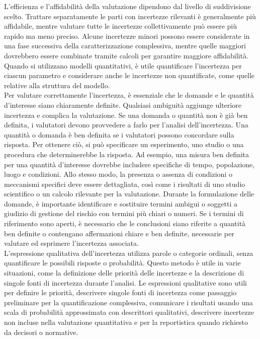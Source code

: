 L'efficienza e l'affidabilità della valutazione dipendono dal livello di suddivisione scelto. Trattare separatamente le parti con incertezze rilevanti è generalmente più affidabile, mentre valutare tutte le incertezze collettivamente può essere più rapido ma meno preciso. Alcune incertezze minori possono essere considerate in una fase successiva della caratterizzazione complessiva, mentre quelle maggiori dovrebbero essere combinate tramite calcoli per garantire maggiore affidabilità. Quando si utilizzano modelli quantitativi, è utile quantificare l'incertezza per ciascun parametro e considerare anche le incertezze non quantificate, come quelle relative alla struttura del modello.\\

Per valutare correttamente l'incertezza, è essenziale che le domande e le quantità d'interesse siano chiaramente definite. Qualsiasi ambiguità aggiunge ulteriore incertezza e complica la valutazione. Se una domanda o quantità non è già ben definita, i valutatori devono provvedere a farlo per l'analisi dell'incertezza. Una quantità o domanda è ben definita se i valutatori possono concordare sulla risposta. Per ottenere ciò, si può specificare un esperimento, uno studio o una procedura che determinerebbe la risposta. Ad esempio, una misura ben definita per una quantità d'interesse dovrebbe includere specifiche di tempo, popolazione, luogo e condizioni. Allo stesso modo, la presenza o assenza di condizioni o meccanismi specifici deve essere dettagliata, così come i risultati di uno studio scientifico o un calcolo rilevante per la valutazione. Durante la formulazione delle domande, è importante identificare e sostituire termini ambigui o soggetti a giudizio di gestione del rischio con termini più chiari o numeri. Se i termini di riferimento sono aperti, è necessario che le conclusioni siano riferite a quantità ben definite o contengano affermazioni chiare e ben definite, necessarie per valutare ed esprimere l'incertezza associata.\\

L'espressione qualitativa dell'incertezza utilizza parole o categorie ordinali, senza quantificare le possibili risposte o probabilità. Questo metodo è utile in varie situazioni, come la definizione delle priorità delle incertezze e la descrizione di singole fonti di incertezza durante l'analisi. Le espressioni qualitative sono utili per definire le priorità, descrivere singole fonti di incertezza come passaggio preliminare per la quantificazione complessiva, comunicare i risultati usando una scala di probabilità approssimata con descrittori qualitativi, descrivere incertezze non incluse nella valutazione quantitativa e per la reportistica quando richiesto da decisori o normative.\\

